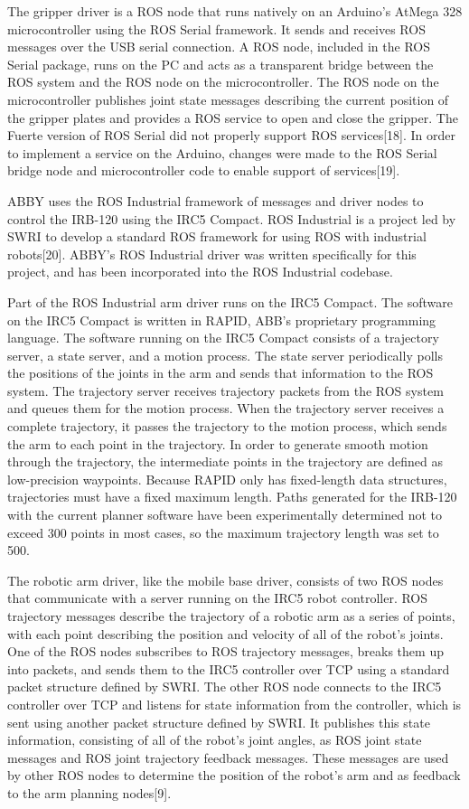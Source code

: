 \documentclass[]{cwru} %
\begin{document}
The gripper driver is a ROS node that runs natively on an Arduino's
AtMega 328 microcontroller using the ROS Serial framework. It sends and
receives ROS messages over the USB serial connection. A ROS node,
included in the ROS Serial package, runs on the PC and acts as a
transparent bridge between the ROS system and the ROS node on the
microcontroller. The ROS node on the microcontroller publishes joint
state messages describing the current position of the gripper plates and
provides a ROS service to open and close the gripper. The Fuerte version
of ROS Serial did not properly support ROS services{[}18{]}. In order to
implement a service on the Arduino, changes were made to the ROS Serial
bridge node and microcontroller code to enable support of
services{[}19{]}.

ABBY uses the ROS Industrial framework of messages and driver nodes to
control the IRB-120 using the IRC5 Compact. ROS Industrial is a project
led by SWRI to develop a standard ROS framework for using ROS with
industrial robots{[}20{]}. ABBY's ROS Industrial driver was written
specifically for this project, and has been incorporated into the ROS
Industrial codebase.

Part of the ROS Industrial arm driver runs on the IRC5 Compact. The
software on the IRC5 Compact is written in RAPID, ABB's proprietary
programming language. The software running on the IRC5 Compact consists
of a trajectory server, a state server, and a motion process. The state
server periodically polls the positions of the joints in the arm and
sends that information to the ROS system. The trajectory server receives
trajectory packets from the ROS system and queues them for the motion
process. When the trajectory server receives a complete trajectory, it
passes the trajectory to the motion process, which sends the arm to each
point in the trajectory. In order to generate smooth motion through the
trajectory, the intermediate points in the trajectory are defined as
low-precision waypoints. Because RAPID only has fixed-length data
structures, trajectories must have a fixed maximum length. Paths
generated for the IRB-120 with the current planner software have been
experimentally determined not to exceed 300 points in most cases, so the
maximum trajectory length was set to 500.

The robotic arm driver, like the mobile base driver, consists of two ROS
nodes that communicate with a server running on the IRC5 robot
controller. ROS trajectory messages describe the trajectory of a robotic
arm as a series of points, with each point describing the position and
velocity of all of the robot's joints. One of the ROS nodes subscribes
to ROS trajectory messages, breaks them up into packets, and sends them
to the IRC5 controller over TCP using a standard packet structure
defined by SWRI. The other ROS node connects to the IRC5 controller over
TCP and listens for state information from the controller, which is sent
using another packet structure defined by SWRI. It publishes this state
information, consisting of all of the robot's joint angles, as ROS joint
state messages and ROS joint trajectory feedback messages. These
messages are used by other ROS nodes to determine the position of the
robot's arm and as feedback to the arm planning nodes{[}9{]}.
\end{document}

